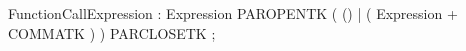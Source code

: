 %
%
%
\begin{rail}
FunctionCallExpression : Expression PAROPENTK
                         ( () | ( Expression + COMMATK ) ) PARCLOSETK
                       ;
\end{rail}
